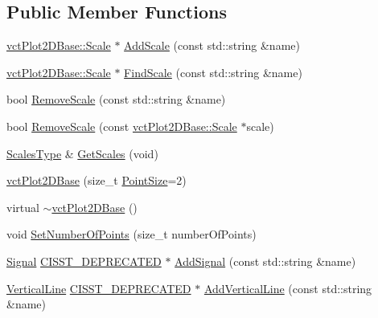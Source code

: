 \subsection*{Public Member Functions}
\begin{DoxyCompactItemize}
\item 
\hyperlink{classvct_plot2_d_base_1_1_scale}{vct\-Plot2\-D\-Base\-::\-Scale} $\ast$ \hyperlink{classvct_plot2_d_base_acedc5097bde86384c8dd84cb27eed287}{Add\-Scale} (const std\-::string \&name)
\item 
\hyperlink{classvct_plot2_d_base_1_1_scale}{vct\-Plot2\-D\-Base\-::\-Scale} $\ast$ \hyperlink{classvct_plot2_d_base_af6dba730fa291243216c223101966508}{Find\-Scale} (const std\-::string \&name)
\item 
bool \hyperlink{classvct_plot2_d_base_a9f8b9e6f26396cad098fe7c7f88b41d8}{Remove\-Scale} (const std\-::string \&name)
\item 
bool \hyperlink{classvct_plot2_d_base_a9b464b78057e628d6f208a4f126ca5b6}{Remove\-Scale} (const \hyperlink{classvct_plot2_d_base_1_1_scale}{vct\-Plot2\-D\-Base\-::\-Scale} $\ast$scale)
\item 
\hyperlink{classvct_plot2_d_base_a0f7274ebd354a06e7102b164f60b7d94}{Scales\-Type} \& \hyperlink{classvct_plot2_d_base_a28375b86e330bde95aaba1789c9aae1a}{Get\-Scales} (void)
\item 
\hyperlink{classvct_plot2_d_base_a40e6a876db4f3e43056271fea5d678ea}{vct\-Plot2\-D\-Base} (size\-\_\-t \hyperlink{classvct_plot2_d_base_a4f238d9c5cefdb5c623b4967ba0e678b}{Point\-Size}=2)
\item 
virtual \hyperlink{classvct_plot2_d_base_a20969e93b167cb1603433817c2ec3aa3}{$\sim$vct\-Plot2\-D\-Base} ()
\item 
void \hyperlink{classvct_plot2_d_base_a3280db43df3cd97945a4ce1420cc657d}{Set\-Number\-Of\-Points} (size\-\_\-t number\-Of\-Points)
\item 
\hyperlink{classvct_plot2_d_base_1_1_signal}{Signal} \hyperlink{cmn_portability_8h_a63da7164735f9501be651b1f2bbc0121}{C\-I\-S\-S\-T\-\_\-\-D\-E\-P\-R\-E\-C\-A\-T\-E\-D} $\ast$ \hyperlink{classvct_plot2_d_base_aee230728556354fafade60b50e8c9a4e}{Add\-Signal} (const std\-::string \&name)
\item 
\hyperlink{classvct_plot2_d_base_1_1_vertical_line}{Vertical\-Line} \hyperlink{cmn_portability_8h_a63da7164735f9501be651b1f2bbc0121}{C\-I\-S\-S\-T\-\_\-\-D\-E\-P\-R\-E\-C\-A\-T\-E\-D} $\ast$ \hyperlink{classvct_plot2_d_base_a36b73535fa077ac082a145b2d2aaf45d}{Add\-Vertical\-Line} (const std\-::string \&name)

\end{DoxyCompactItemize}
